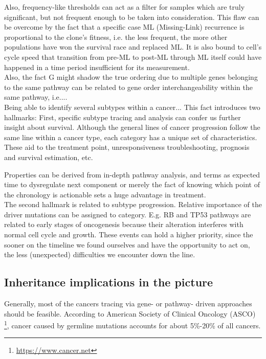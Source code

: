 Also, frequency-like thresholds can act as a filter for samples which are truly significant, but not frequent enough to be taken into consideration. This flaw can be overcome by the fact that a specific case ML (Missing-Link) recurrence is proportional to the clone's fitness, i.e. the less frequent, the more other populations have won the survival race and replaced ML. It is also bound to cell's cycle speed that transition from pre-ML to post-ML through ML itself could have happened in a time period insufficient for its measurement.
\\

Also, the fact G might shadow the true ordering due to multiple genes belonging to the same pathway can be related to gene order interchangeability within the same pathway, i.e....
\\

Being able to identify several subtypes within a cancer...
This fact introduces two hallmarks: First, specific subtype tracing and analysis can confer us further insight about survival. Although the general lines of cancer progression follow the same line within a cancer type, each category has a unique set of characteristics. These aid to the treatment point, unresponsiveness troubleshooting, prognosis and survival estimation, etc.

Properties can be derived from in-depth pathway analysis, and terms as expected time to dysregulate next component or merely the fact of knowing which point of the chronology is actionable sets a huge advantage in treatment.
\\

The second hallmark is related to subtype progression. Relative importance of the driver mutations can be assigned to category. E.g. RB and TP53 pathways are related to early stages of oncogenesis because their alteration interferes with normal cell cycle and growth. These events can hold a higher priority, since the sooner on the timeline we found ourselves and have the opportunity to act on, the less (unexpected) difficulties we encounter down the line.

\subsection{Inheritance implications in the picture}
Generally, most of the cancers tracing via gene- or pathway- driven approaches should be feasible. According to American Society of Clinical Oncology (ASCO) \footnote{\url{https://www.cancer.net}}, cancer caused by germline mutations accounts for about 5\%-20\% of all cancers.
\\

